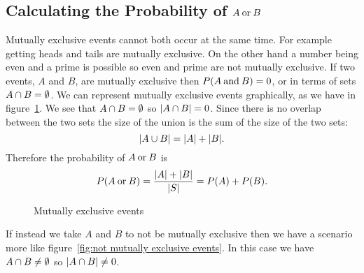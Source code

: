     \subsection{Calculating the Probability of \texorpdfstring{\(A \mathbin{\operatorname{or}} B\)}{A or B}}
    Mutually exclusive events cannot both occur at the same time.
    For example getting heads and tails are mutually exclusive.
    On the other hand a number being even and a prime is possible so even and prime are not mutually exclusive.
    If two events, \(A\) and \(B\), are mutually exclusive then \(P(A\mathbin{\operatorname{and}} B) = 0\), or in terms of sets \(A\cap B = \emptyset\).
    We can represent mutually exclusive events graphically, as we have in figure~\ref{fig:mutually exclusive events}.
    We see that \(A\cap B = \emptyset\) so \(|A\cap B| = 0\).
    Since there is no overlap between the two sets the size of the union is the sum of the size of the two sets:
    \[|A\cup B| = |A| + |B|.\]
    Therefore the probability of \(A \mathbin{\operatorname{or}} B\) is
    \[P(A\mathbin{\operatorname{or}} B) = \frac{|A| + |B|}{|S|} = P(A) + P(B).\]
    \begin{figure}[ht]
        \centering
        \caption{Mutually exclusive events}
        \label{fig:mutually exclusive events}
    \end{figure}
    If instead we take \(A\) and \(B\) to not be mutually exclusive then we have a scenario more like figure~\ref{fig:not mutually exclusive events}.
    In this case we have \(A\cap B \ne \emptyset\) so \(|A\cap B| \ne 0\).
